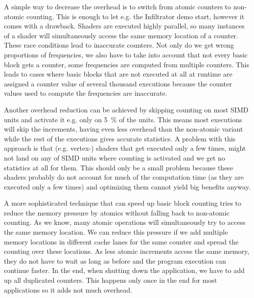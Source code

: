 A simple way to decrease the overhead is to switch from atomic counters to non-atomic counting. This is enough to let e.g. the Infiltrator demo start, however it comes with a drawback. Shaders are executed highly parallel, so many instances of a shader will simultaneously access the same memory location of a counter.
These race conditions lead to inaccurate counters. Not only do we get wrong proportions of frequencies, we also have to take into account that not every basic block gets a counter, some frequencies are computed from multiple counters. This leads to cases where basic blocks that are not executed at all at runtime are assigned a counter value of several thousand executions because the counter values used to compute the frequencies are inaccurate.

Another overhead reduction can be achieved by skipping counting on most SIMD units and activate it e.g. only on \SI{5}{\percent} of the units.
This means most executions will skip the increments, having even less overhead than the non-atomic variant while the rest of the executions gives accurate statistics.
A problem with this approach is that (e.g. vertex-) shaders that get executed only a few times, might not land on any of SIMD units where counting is activated and we get no statistics at all for them.
This should only be a small problem because these shaders probably do not account for much of the computation time (as they are executed only a few times) and optimizing them cannot yield big benefits anyway.

A more sophisticated technique that can speed up basic block counting tries to reduce the memory pressure by atomics without falling back to non-atomic counting. As we know, many atomic operations will simultaneously try to access the same memory location.
We can reduce this pressure if we add multiple memory locations in different cache lanes for the same counter and spread the counting over these locations. As less atomic increments access the same memory, they do not have to wait as long as before and the program execution can continue faster.
In the end, when shutting down the application, we have to add up all duplicated counters. This happens only once in the end for most applications so it adds not much overhead.
